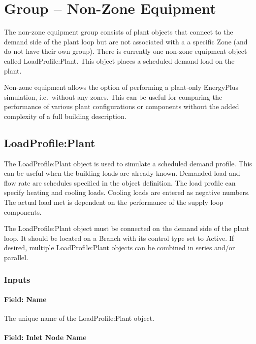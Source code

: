 \section{Group -- Non-Zone Equipment}\label{group-non-zone-equipment}

The non-zone equipment group consists of plant objects that connect to the demand side of the plant loop but are not associated with a a specific Zone (and do not have their own group). There is currently one non-zone equipment object called LoadProfile:Plant. This object places a scheduled demand load on the plant.

Non-zone equipment allows the option of performing a plant-only EnergyPlus simulation, i.e.~without any zones. This can be useful for comparing the performance of various plant configurations or components without the added complexity of a full building description.

\subsection{LoadProfile:Plant}\label{loadprofileplant}

The LoadProfile:Plant object is used to simulate a scheduled demand profile. This can be useful when the building loads are already known. Demanded load and flow rate are schedules specified in the object definition. The load profile can specify heating and cooling loads. Cooling loads are entered as negative numbers. The actual load met is dependent on the performance of the supply loop components.

The LoadProfile:Plant object must be connected on the demand side of the plant loop. It should be located on a Branch with its control type set to Active. If desired, multiple LoadProfile:Plant objects can be combined in series and/or parallel.

\subsubsection{Inputs}\label{inputs-028}

\paragraph{Field: Name}\label{field-name-027}

The unique name of the LoadProfile:Plant object.

\paragraph{Field: Inlet Node Name}\label{field-inlet-node-name-002}

